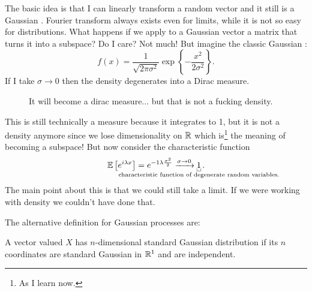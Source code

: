 \documentclass{report}
\begin{document}
The basic idea is that I can linearly transform a random vector and it still is a Gaussian \rv. Fourier transform always exists even for limits, while it is not so easy for distributions. What happens if we apply to a Gaussian vector a matrix that turns it into a subspace? Do I care? Not much! But imagine the classic Gaussian \rv:
\begin{equation*}
	f(x)=\frac{1}{\sqrt{2\pi \sigma^{2}}}\exp\left\{-\frac{x^{2}}{2\sigma^{2}}\right\}.
\end{equation*}
If I take $\sigma\to0$ then the density degenerates into a Dirac measure.
\begin{figure}[h]
	\centering
	\label{fig:gaugau}
	\caption{It will become a dirac measure... but that is not a fucking density.}
\end{figure}
This is still technically a measure because it integrates to 1, but it is not a density anymore since we lose dimensionality on $\mathbb{R}$ which is\footnote{As I learn now.} the meaning of becoming a subspace! But now consider the characteristic function
\begin{equation*}
	\ev\left[e^{i\lambda x}\right]=e^{-1\lambda\frac{\sigma^{2}}{2}}\xrightarrow{\sigma\to0}\ubracketthin{1}_{\claptext{characteristic function of degenerate \rv s.}}.
\end{equation*}
The main point about this is that we could still take a limit. If we were working with density we couldn't have done that.\par
The alternative definition for Gaussian processes are:
\begin{definition}
	A vector valued \rv{} $X$ has $n$-dimensional standard Gaussian distribution if its $n$ coordinates are standard Gaussian in $\mathbb{R}^{1}$ and are independent.
\end{definition} 
\end{document}
